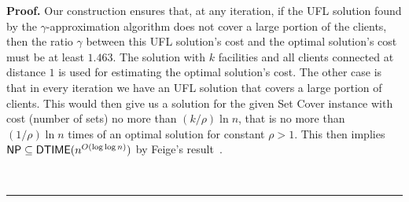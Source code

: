 \documentclass[oneside,final]{ucr}
\newenvironment{proof}[1][Proof]{\textbf{#1.} }{\ \rule{0.5em}{0.5em}}
\begin{document}
\begin{proof}
  Our construction ensures that, at any iteration, if the
  UFL solution found by the $\gamma$-approximation {\UFL}
  algorithm does not cover a large portion of the clients,
  then the ratio $\gamma$ between this UFL solution's cost
  and the optimal solution's cost must be at least
  $1.463$. The solution with $k$ facilities and all clients
  connected at distance $1$ is used for estimating the
  optimal solution's cost. The other case is that in every
  iteration we have an UFL solution that covers a large
  portion of clients. This would then give us a solution for
  the given Set Cover instance with cost (number of sets) no
  more than $(k/\rho) \ln n$, that is no more than $(1/\rho)
  \ln n$ times of an optimal solution for constant $\rho >
  1$. This then implies ${\mbox{\sf NP}} \subseteq {\mbox{\sf DTIME}}(n^{O(\log\log
    n)})$ by Feige's result~\cite{Feige98}.

\end{proof}
\end{document}
